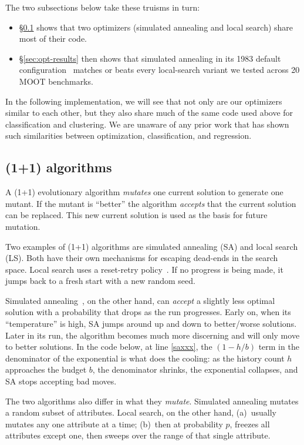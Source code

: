 \documentclass[AMA,STIX2COL]{WileyNJDv5}
\begin{document}
The two subsections below take
these truisms in turn:
\begin{itemize}
\item
\S\ref{sec:oneplus} shows that two optimizers (simulated
annealing and local search) share most of their code.
\item
\S\ref{sec:opt-results} then shows that simulated annealing in
its 1983 default configuration~\cite{kirkpatrick1983optimization}
matches or beats every local-search variant we tested across 20
MOOT benchmarks.
\end{itemize}
In the following implementation, we will see that not only are our
optimizers similar to each other, but they also share much of the
same code used above for classification and clustering.
We are unaware of any prior work that has shown such similarities
between optimization, classification, and regression.

\subsection{(1+1) algorithms}\label{sec:oneplus}
A (1+1) evolutionary algorithm {\em mutates} one current solution
to generate one mutant. If the mutant is ``better'' the algorithm
{\em accepts} that the current solution can be replaced. This new
current solution is used as the basis for future mutation.

Two examples of (1+1) algorithms are simulated annealing (SA) and
local search (LS). Both have their own mechanisms for escaping
dead-ends in the search space. 
Local search uses  a reset-retry policy~\cite{Crawford:1994}.
If no progress is being made, it jumps back to a fresh start with a  new random seed.

Simulated annealing~\cite{kirkpatrick1983optimization}, on the other hand, can {\em accept}
a slightly less optimal solution with a probability that drops as
the run progresses. Early on, when its ``temperature'' is high, 
SA jumps around up and down to better/worse solutions.
Later in its run, the algorithm
becomes much more discerning and will only move to better solutions.  
In the code below,
at line \ref{saxxx}, the $(1-h/b)$ term in the
denominator of the exponential is what does the cooling: as the
history count $h$ approaches the budget $b$, the denominator
shrinks, the exponential collapses, and SA stops accepting bad
moves.


The two algorithms also differ in what they {\em mutate}. Simulated
annealing mutates a random subset of attributes. Local search, on the other hand,
(a)~usually mutates any one attribute at a time; (b)~then at
probability $p$, freezes all attributes except one, then sweeps over the range
of that single attribute.
\end{document}
